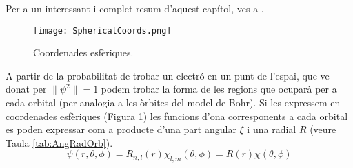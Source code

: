 Per a un interessant i complet resum d'aquest capítol, ves a .
\begin{figure}[h]
\centering
\texttt{[image: SphericalCoords.png]}
\caption{Coordenades esfèriques.}
\label{fig:SphericalCoords}
\end{figure}
A partir de la probabilitat de trobar un electró en un punt de l'espai, que ve donat per $\|\psi^2\|=1$ podem trobar la forma de les regions que ocuparà per a cada orbital (per analogia a les òrbites del model de Bohr). Si les expressem en coordenades esfèriques (Figura \ref{fig:SphericalCoords}) les funcions d'ona corresponents a cada orbital es poden expressar com a producte d'una part angular $\xi$ i una radial $R$ (veure Taula \ref{tab:AngRadOrb}).
\begin{equation}
\psi(r,\theta,\phi)=R_{n,l}(r)\chi_{l,m}(\theta,\phi)=R(r)\chi(\theta,\phi)
\label{Eq:psisplit}
\end{equation}
